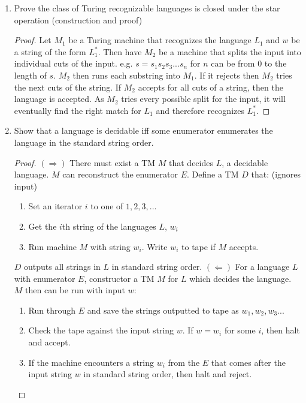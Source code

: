 \documentclass{article}
\begin{document}
\begin{enumerate}
\begin{proof}
            respectfully. Then let $M_3$ be a machine that will run input $w$ on $M_1$ then $M_2$.
            If both machines reject, then $w$ is not in the languages of $L_1\cap L_2$. If one or
            more machines accepts then $w$ is in the language.
        \end{proof}
        \item Prove the class of Turing recognizable languages is closed under the star operation 
        (construction and proof)
        \begin{proof}
            Let $M_1$ be a Turing machine that recognizes the language $L_1$ and $w$ be a string 
            of the form $L_1^*$. Then have $M_2$ be a machine that splits the input into individual 
            cuts of the input. e.g. $s = s_1s_2s_3...s_n$ for $n$ can be from 0 to the length of 
            $s$. $M_2$ then runs each substring into $M_1$. If it rejects then $M_2$ tries the next
            cuts of the string. If $M_2$ accepts for all cuts of a string, then the language is 
            accepted. As $M_2$ tries every possible split for the input, it will eventually find
            the right match for $L_1$ and therefore recognizes $L_1^*$.
        \end{proof}
        \item Show that a language is decidable iff some enumerator enumerates the language in
        the standard string order.
        \begin{proof}
            $(\Rightarrow)$ There must exist a TM $M$ that decides $L$, a decidable language. $M$
            can reconstruct the enumerator $E$. Define a TM $D$ that: (ignores input)
            \begin{enumerate}
                \item Set an iterator $i$ to one of $1, 2, 3,...$
                \item Get the $i$th string of the languages $L$, $w_i$
                \item Run machine $M$ with string $w_i$. Write $w_i$ to tape if $M$ accepts.
            \end{enumerate}
            $D$ outputs all strings in $L$ in standard string order.\newline
            $(\Leftarrow)$ For a language $L$ with enumerator $E$, constructor a TM $M$ for $L$
            which decides the language. $M$ then can be run with input $w$:
            \begin{enumerate}
                \item Run through $E$ and save the strings outputted to tape as $w_1,w_2,w_3...$
                \item Check the tape against the input string $w$. If $w = w_i$ for some $i$, then
                halt and accept.
                \item If the machine encounters a string $w_i$ from the $E$ that comes after the input
                string $w$ in standard string order, then halt and reject.
            \end{enumerate}
        \end{proof}
    \end{enumerate}
\end{document}
